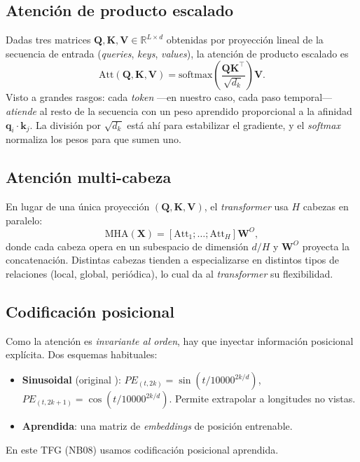 \subsection{Atención de producto escalado}

Dadas tres matrices $\bm{Q}, \bm{K}, \bm{V} \in \mathbb{R}^{L \times d}$ obtenidas por proyección lineal de la secuencia de entrada (\textit{queries}, \textit{keys}, \textit{values}), la atención de producto escalado es
\begin{equation}
\mathrm{Att}(\bm{Q}, \bm{K}, \bm{V}) = \mathrm{softmax}\!\left( \frac{\bm{Q} \bm{K}^\top}{\sqrt{d_k}} \right) \bm{V}.
\label{eq:attention}
\end{equation}
Visto a grandes rasgos: cada \textit{token} ---en nuestro caso, cada paso temporal--- \emph{atiende} al resto de la secuencia con un peso aprendido proporcional a la afinidad $\bm{q}_i \cdot \bm{k}_j$. La división por $\sqrt{d_k}$ está ahí para estabilizar el gradiente, y el \emph{softmax} normaliza los pesos para que sumen uno.

\subsection{Atención multi-cabeza}

En lugar de una única proyección $(\bm{Q}, \bm{K}, \bm{V})$, el \textit{transformer} usa $H$ cabezas en paralelo:
\begin{equation}
\mathrm{MHA}(\bm{X}) = [\mathrm{Att}_1; \ldots; \mathrm{Att}_H] \bm{W}^O,
\label{eq:mha}
\end{equation}
donde cada cabeza opera en un subespacio de dimensión $d/H$ y $\bm{W}^O$ proyecta la concatenación. Distintas cabezas tienden a especializarse en distintos tipos de relaciones (local, global, periódica), lo cual da al \textit{transformer} su flexibilidad.

\subsection{Codificación posicional}

Como la atención es \emph{invariante al orden}, hay que inyectar información posicional explícita. Dos esquemas habituales:
\begin{itemize}[leftmargin=*,topsep=0pt]
  \item \textbf{Sinusoidal} (original \cite{vaswani2017attention}): $PE_{(t, 2k)} = \sin(t / 10000^{2k/d})$, $PE_{(t, 2k+1)} = \cos(t / 10000^{2k/d})$. Permite extrapolar a longitudes no vistas.
  \item \textbf{Aprendida}: una matriz de \textit{embeddings} de posición entrenable.
\end{itemize}
En este TFG (NB08) usamos codificación posicional aprendida.

